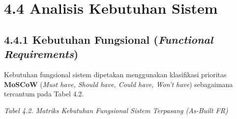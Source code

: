 \documentclass[
  indonesian,
  12pt,
]{report}
\begin{document}
\section{4.4 Analisis Kebutuhan Sistem}\label{analisis-kebutuhan-sistem}

\subsection{\texorpdfstring{4.4.1 Kebutuhan Fungsional (\emph{Functional
Requirements})}{4.4.1 Kebutuhan Fungsional (Functional Requirements)}}\label{kebutuhan-fungsional-functional-requirements}

Kebutuhan fungsional sistem dipetakan menggunakan klasifikasi prioritas
\textbf{MoSCoW} (\emph{Must have, Should have, Could have, Won't have})
sebagaimana tercantum pada Tabel 4.2.

\emph{Tabel 4.2. Matriks Kebutuhan Fungsional Sistem Terpasang (As-Built
FR)}
\end{document}
